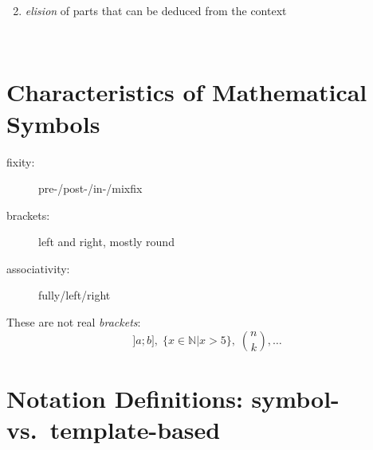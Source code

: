\documentclass[a0,portrait]{a0poster}
\begin{document}
\begin{multicols}{2}
\begin{minipage}[t]{.30\linewidth}
\begin{center}
\end{center}
\end{minipage}\hspace{.01\linewidth}%
\begin{minipage}[t]{.30\linewidth}
  {\raggedright
  \begin{enumerate}
    \setcounter{enumi}{1}
  \item \emph{elision} of parts that can be deduced from the context
  \end{enumerate}}
\begin{center}
\end{center}
\end{minipage}\\

\section*{Characteristics of Mathematical Symbols}
\label{sec:charac}

\begin{minipage}[t]{.55\linewidth}
  \raggedright
  \begin{description}
  \item[fixity:] pre-/post-/in-/mixfix
  \item[brackets:] left and right, mostly round
  \item[associativity:] fully/left/right
  \end{description}
\end{minipage}%
\begin{minipage}[t]{.4\linewidth}
  \raggedright
  \Lightning{} These are not real \emph{brackets}:
  \[
  ]a;b],\;\{x\in\mathbb{N}|x>5\},\;\binom{n}{k},\ldots
  \]
\end{minipage}
\section*{Notation Definitions: symbol- vs.\ template-based}
\label{sec:notdef}


\end{multicols}
\end{document}
